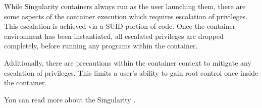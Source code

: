 \documentclass[letterpaper,10pt,english]{sphinxmanual}
\begin{document}
While Singularity containers always run as the user launching them, there are some aspects of the container execution which requires escalation of privileges. This escalation is achieved via a SUID portion of code. Once the container environment has been instantiated, all escalated privileges are dropped completely, before running any programs within the container.

Additionally, there are precautions within the container context to mitigate any escalation of privileges. This limits a user’s ability to gain root control once inside the container.

You can read more about the Singularity {\hyperref[\detokenize{introduction:security-and-privilege-escalation}]{}}.



\renewcommand{\indexname}{Index}
\printindex
\end{document}
